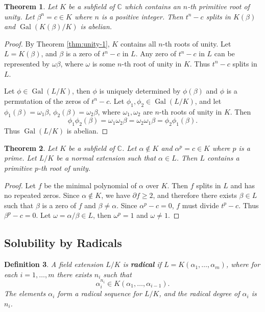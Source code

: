\documentclass[12pt]{article}
\newtheorem{theorem}{Theorem}
\newtheorem{definition}[theorem]{Definition}
\newcommand{\Gal}{\operatorname{Gal}}
\begin{document}
\begin{theorem} \label{thm:radical-2}
    Let $K$ be a subfield of $\mathbb{C}$ which contains an $n$-th primitive
    root of unity. Let $\beta^n = c \in K $ where $n$ is a positive integer.
    Then
    $t^n - c$ splits in $K(\beta)$ and $\Gal(K(\beta) / K)$ is abelian.
\end{theorem}

\begin{proof}
    By Theorem \ref{thm:unity-1}, $K$ contains all $n$-th roots of unity. Let
    $L =
        K(\beta)$, and $\beta$ is a zero of $t^n-c$ in $L$. Any zero of $t^n-c$
    in $L$
    can be represented by $\omega \beta$, where $\omega$ is some $n$-th root of
    unity in $K$. Thus $t^n - c$ splits in $L$.

    Let $\phi \in \Gal(L / K)$, then $\phi$ is uniquely determined by
    $\phi(\beta)$
    and $\phi$ is a permutation of the zeros of $t^n - c$. Let $\phi_1, \phi_2
        \in
        \Gal(L / K)$, and let $\phi_1(\beta) = \omega_1\beta$, $\phi_2(\beta) =
        \omega_2\beta$, where $\omega_1, \omega_2$ are $n$-th roots of unity in
    $K$.
    Then
    $$
        \phi_1 \phi_2(\beta)=\omega_1 \omega_2 \beta=\omega_2 \omega_1
        \beta=\phi_2
        \phi_1(\beta).
    $$
    Thus $\Gal(L / K)$ is abelian.
\end{proof}

\begin{theorem} \label{thm:unity-3}
    Let $K$ be a subfield of $\mathbb C$. Let $\alpha \notin K$ and $\alpha^p =
        c
        \in K$ where $p$ is a prime. Let $L / K$ be a normal extension such
    that
    $\alpha \in L$. Then $L$ contains a primitive $p$-th root of unity.
\end{theorem}

\begin{proof}
    Let $f$ be the minimal polynomial of $\alpha$ over $K$. Then $f$ splits in
    $L$
    and has no repeated zeros. Since $\alpha \notin K$, we have $\partial f \ge
        2$,
    and therefore there exists $\beta \in L$ such that $\beta$ is a zero of $f$
    and
    $\beta \neq \alpha$. Since $\alpha ^ p - c = 0$, $f$ must divide $t ^ p -
        c$.
    Thus $\beta^p - c = 0$. Let $\omega=\alpha / \beta \in L $, then
    $\omega^p=1$
    and $\omega \neq 1$.
\end{proof}

\subsection{Solubility by Radicals}
\begin{definition} \label{def:radical-extension}
    A field extension $L / K$ is \textbf{radical} if $L=K\left(\alpha_1,
        \ldots, \alpha_m\right)$, where for each $i=1, \ldots, m$ there exists
    $n_i$
    such that
    $$
        \alpha_i^{n_i} \in K\left(\alpha_1, \ldots, \alpha_{i-1}\right).
    $$
    The elements $\alpha_i$ form a radical sequence for $L / K$, and the
    radical
    degree of $\alpha_i$ is $n_i$.
\end{definition}
\end{document}
